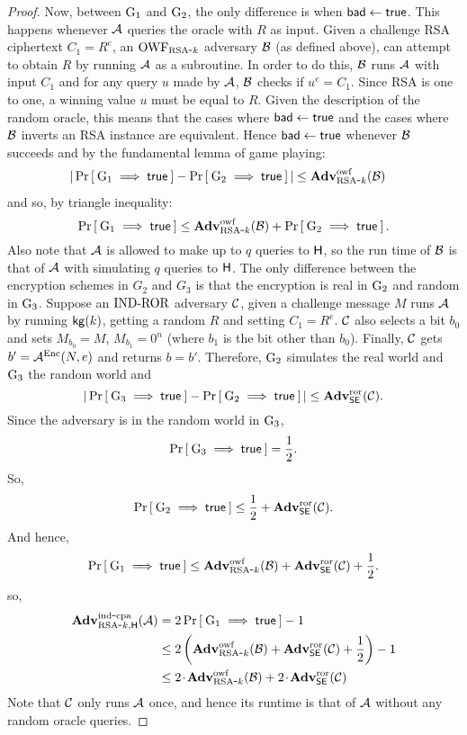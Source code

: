 \begin{proof}
Now, between $\G_1$ and $\G_2$, the only difference is when $\badtrue$. This happens whenever $\advA$ queries the oracle with $R$ as input. Given a challenge RSA ciphertext $C_1 = R^e$, an $\OWF_{\RSAk}$ adversary $\advB$ (as defined above), can attempt to obtain $R$ by running $\advA$ as a subroutine. In order to do this, $\advB$ runs $\advA$ with input $C_1$ and for any query $u$ made by $\advA$, $\advB$ checks if $u^e = C_1$. Since RSA is one to one, a winning value $u$ must be equal to $R$. Given the description of the random oracle, this means that the cases where $\badtrue$ and the cases where $\advB$ inverts an RSA instance are equivalent. Hence $\badtrue$ whenever $\advB$ succeeds and by the fundamental lemma of game playing:
\begin{align*}
|\Prob{\G_1 \implies \true} - \Prob{\G_2\implies \true}| &\leq \AdvOWF{\RSAk}{\advB}
\end{align*}
and so, by triangle inequality:
\[
\Prob{\G_1 \implies \true} \le \AdvOWF{\RSAk}{\advB} + \Prob{\G_2 \implies \true}.
\]
Also note that $\advA$ is allowed to make up to $q$ queries to $\Horacle$, so the run time of $\advB$ is that of $\advA$ with simulating $q$ queries to $\Horacle$.
The only difference between the encryption schemes in $G_2$ and $G_3$ is that the encryption is real in $\G_2$ and random in $\G_3$. Suppose an $\INDROR$ adversary $\advC$, given a challenge message $M$ runs $\advA$ by running $\kg(k)$, getting a random $R$ and setting $C_1 = R^e$. $\advC$ also selects a bit $b_0$ and sets $M_{b_0} = M$, $M_{b_1} = 0^n$ (where $b_1$ is the bit other than $b_0$). Finally, $\advC$ gets $b' = \advA^{\EncOracle}(N, e)$ and returns $b = b'$. Therefore, $\G_2$ simulates the real world and $\G_3$ the random world and%
\[
|\Prob{\G_3 \implies \true} - \Prob{\G_2\implies \true}| \leq \AdvROR{\SEscheme}{\advC}.
\]
Since the adversary is in the random world in $\G_3$,
\[
\Prob{\G_3 \implies \true} = \frac{1}{2}.
\]
So,
\[
\Prob{\G_2 \implies \true} \le \frac{1}{2} + \AdvROR{\SEscheme}{\advC}.
\]
And hence,
\[
\Prob{\G_1 \implies \true} \le \AdvOWF{\RSAk}{\advB} +\AdvROR{\SEscheme}{\advC} +  \frac{1}{2}.
\]
so,
\begin{align*}
\AdvINDCPA{\RSAk,\Horacle}{\advA} &= 2\Prob{\G_1\implies \true}  - 1\\
							 &\le 2\left(\AdvOWF{\RSAk}{\advB} +\AdvROR{\SEscheme}{\advC} +  \frac{1}{2}\right) - 1\\
							 &\le 2\cdotsm\AdvOWF{\RSAk}{\advB} +2\cdotsm\AdvROR{\SEscheme}{\advC}
\end{align*}
Note that $\advC$ only runs $\advA$ once, and hence its runtime is that of $\advA$ without any random oracle queries.
\end{proof}



